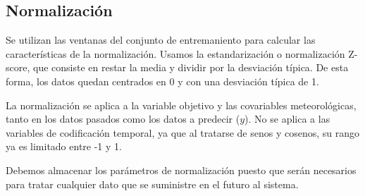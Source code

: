 \subsection{Normalización}
Se utilizan las ventanas del conjunto de entremaniento para calcular las características de la normalización.
Usamos la estandarización o normalización Z-score, que consiste en restar la media y dividir por la desviación típica.
De esta forma, los datos quedan centrados en 0 y con una desviación típica de 1.

La normalización se aplica a la variable objetivo y las covariables meteorológicas, tanto en los datos pasados como los datos a predecir ($y$). 
No se aplica a las variables de codificación temporal, ya que al tratarse de senos y cosenos, su rango ya es limitado entre -1 y 1.

Debemos almacenar los parámetros de normalización puesto que serán necesarios para tratar cualquier dato que se suministre en el futuro al sistema.
